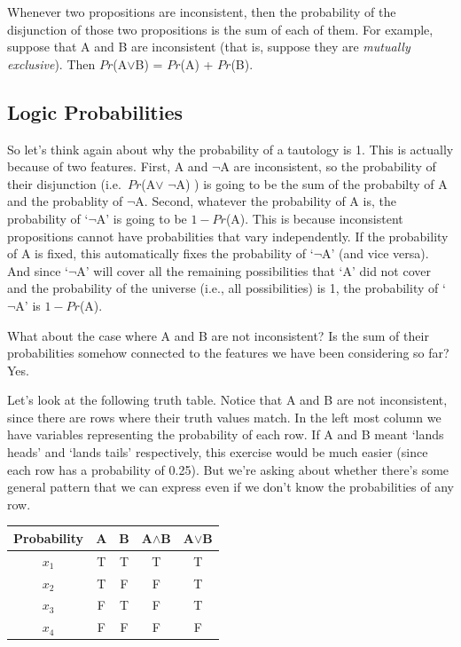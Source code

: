 \documentclass[]{tufte-book}
\begin{document}
Whenever two propositions are inconsistent, then the probability of the disjunction of those two propositions is the sum of each of them. For example, suppose that A and B are inconsistent (that is, suppose they are \emph{mutually exclusive}). Then \(Pr\)(A\(\vee\)B) = \(Pr\)(A) + \(Pr\)(B).

\hypertarget{logic-probabilities}{%
\subsection{Logic Probabilities}\label{logic-probabilities}}

So let's think again about why the probability of a tautology is 1. This is actually because of two features. First, A and \(\neg\)A are inconsistent, so the probability of their disjunction (i.e.~\(Pr\)(A\(\vee\) \(\neg\)A) ) is going to be the sum of the probabilty of A and the probablity of \(\neg\)A. Second, whatever the probability of A is, the probability of `\(\neg\)A' is going to be \(1-Pr\)(A). This is because inconsistent propositions cannot have probabilities that vary independently. If the probability of A is fixed, this automatically fixes the probability of `\(\neg\)A' (and vice versa). And since `\(\neg\)A' will cover all the remaining possibilities that `A' did not cover and the probability of the universe (i.e., all possibilities) is 1, the probability of `\(\neg\)A' is \(1-Pr\)(A).

What about the case where A and B are not inconsistent? Is the sum of their probabilities somehow connected to the features we have been considering so far? Yes.

Let's look at the following truth table. Notice that A and B are not inconsistent, since there are rows where their truth values match. In the left most column we have variables representing the probability of each row. If A and B meant `lands heads' and `lands tails' respectively, this exercise would be much easier (since each row has a probability of 0.25). But we're asking about whether there's some general pattern that we can express even if we don't know the probabilities of any row.

\begin{longtable}[]{@{}ccccc@{}}
\toprule
Probability & A & B & A\(\wedge\)B & A\(\vee\)B\tabularnewline
\midrule
\endhead
\(x_1\) & T & T & T & T\tabularnewline
\(x_2\) & T & F & F & T\tabularnewline
\(x_3\) & F & T & F & T\tabularnewline
\(x_4\) & F & F & F & F\tabularnewline
\bottomrule
\end{longtable}
\end{document}

